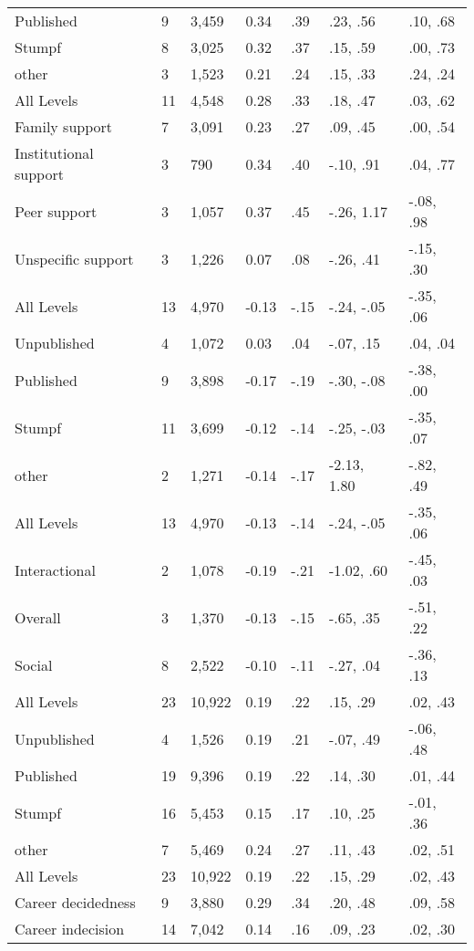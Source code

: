 \begin{table}[ht]
\begin{tabular}{lllllll}
  Published & 9 &  3,459 & 0.34 & .39 & .23, .56 & .10, .68 \\ 
  Stumpf & 8 &  3,025 & 0.32 & .37 & .15, .59 & .00, .73 \\ 
  other & 3 &  1,523 & 0.21 & .24 & .15, .33 & .24, .24 \\ 
  All Levels & 11 &  4,548 & 0.28 & .33 & .18, .47 & .03, .62 \\ 
  Family support & 7 &  3,091 & 0.23 & .27 & .09, .45 & .00, .54 \\ 
  Institutional support & 3 &    790 & 0.34 & .40 & -.10, .91 & .04, .77 \\ 
  Peer support & 3 &  1,057 & 0.37 & .45 & -.26, 1.17 & -.08, .98 \\ 
  Unspecific support & 3 &  1,226 & 0.07 & .08 & -.26, .41 & -.15, .30 \\ 
  All Levels & 13 &  4,970 & -0.13 & -.15 & -.24, -.05 & -.35, .06 \\ 
  Unpublished & 4 &  1,072 & 0.03 & .04 & -.07, .15 & .04, .04 \\ 
  Published & 9 &  3,898 & -0.17 & -.19 & -.30, -.08 & -.38, .00 \\ 
  Stumpf & 11 &  3,699 & -0.12 & -.14 & -.25, -.03 & -.35, .07 \\ 
  other & 2 &  1,271 & -0.14 & -.17 & -2.13, 1.80 & -.82, .49 \\ 
  All Levels & 13 &  4,970 & -0.13 & -.14 & -.24, -.05 & -.35, .06 \\ 
  Interactional & 2 &  1,078 & -0.19 & -.21 & -1.02, .60 & -.45, .03 \\ 
  Overall & 3 &  1,370 & -0.13 & -.15 & -.65, .35 & -.51, .22 \\ 
  Social & 8 &  2,522 & -0.10 & -.11 & -.27, .04 & -.36, .13 \\ 
  All Levels & 23 & 10,922 & 0.19 & .22 & .15, .29 & .02, .43 \\ 
  Unpublished & 4 &  1,526 & 0.19 & .21 & -.07, .49 & -.06, .48 \\ 
  Published & 19 &  9,396 & 0.19 & .22 & .14, .30 & .01, .44 \\ 
  Stumpf & 16 &  5,453 & 0.15 & .17 & .10, .25 & -.01, .36 \\ 
  other & 7 &  5,469 & 0.24 & .27 & .11, .43 & .02, .51 \\ 
  All Levels & 23 & 10,922 & 0.19 & .22 & .15, .29 & .02, .43 \\ 
  Career decidedness & 9 &  3,880 & 0.29 & .34 & .20, .48 & .09, .58 \\ 
  Career indecision & 14 &  7,042 & 0.14 & .16 & .09, .23 & .02, .30 \\ 

\end{tabular}
\end{table}

